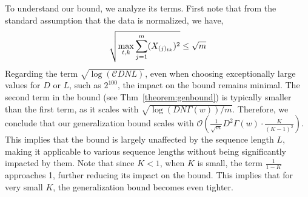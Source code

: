 To understand our bound, we analyze its terms. %
First note that from the standard assumption that the data is normalized, we have,
%
%
\vspace{-8pt}
{\small
\begin{equation}
\sqrt{ \max_{t,k} \sum_{j=1}^m (X_{(j)_{tk}})^2} \leq \sqrt{m}   
\vspace{-2pt}
\end{equation}
}
%
% 
Regarding the term \(\sqrt{\log(\mathcal{C}DNL)}\), even when choosing exceptionally large values for \(D\) or \(L\), such as \(2^{100}\), the impact on the bound remains minimal. The second term in the bound (see Thm~\ref{theorem:genbound}) is typically smaller than the first term, as it scales with \(\sqrt{\log(DN\Gamma(w))/m}\). Therefore, we conclude that our generalization bound scales with \(\mathcal{O}\left(\frac{1}{\sqrt{m}}D^{2} \Gamma(w) \cdot  \frac{K}{(K-1)^2}\right)\). This implies that the bound is largely unaffected by the sequence length \(L\), making it applicable to various sequence lengths without being significantly impacted by them. Note that since \( K < 1 \), when \( K \) is small, the term \(\frac{1}{1-K}\) approaches 1, further reducing its impact on the bound. This implies that for very small \( K \), the generalization bound becomes even tighter.
%
